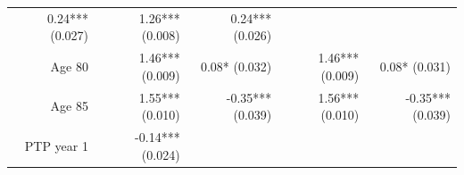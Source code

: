 \documentclass[]{article}
\begin{document}
\begin{longtable}[c]{@{}rrrrr@{}}
\begin{minipage}[t]{0.16\columnwidth}
0.24*** (0.027)
\strut\end{minipage} &
\begin{minipage}[t]{0.21\columnwidth}\raggedleft\strut
1.26*** (0.008)
\strut\end{minipage} &
\begin{minipage}[t]{0.15\columnwidth}\raggedleft\strut
0.24*** (0.026)
\strut\end{minipage}\tabularnewline
\begin{minipage}[t]{0.17\columnwidth}\raggedleft\strut
Age 80
\strut\end{minipage} &
\begin{minipage}[t]{0.18\columnwidth}\raggedleft\strut
1.46*** (0.009)
\strut\end{minipage} &
\begin{minipage}[t]{0.16\columnwidth}\raggedleft\strut
0.08* (0.032)
\strut\end{minipage} &
\begin{minipage}[t]{0.21\columnwidth}\raggedleft\strut
1.46*** (0.009)
\strut\end{minipage} &
\begin{minipage}[t]{0.15\columnwidth}\raggedleft\strut
0.08* (0.031)
\strut\end{minipage}\tabularnewline
\begin{minipage}[t]{0.17\columnwidth}\raggedleft\strut
Age 85
\strut\end{minipage} &
\begin{minipage}[t]{0.18\columnwidth}\raggedleft\strut
1.55*** (0.010)
\strut\end{minipage} &
\begin{minipage}[t]{0.16\columnwidth}\raggedleft\strut
-0.35*** (0.039)
\strut\end{minipage} &
\begin{minipage}[t]{0.21\columnwidth}\raggedleft\strut
1.56*** (0.010)
\strut\end{minipage} &
\begin{minipage}[t]{0.15\columnwidth}\raggedleft\strut
-0.35*** (0.039)
\strut\end{minipage}\tabularnewline
\begin{minipage}[t]{0.17\columnwidth}\raggedleft\strut
PTP year 1
\strut\end{minipage} &
\begin{minipage}[t]{0.18\columnwidth}\raggedleft\strut
-0.14*** (0.024)
\strut\end{minipage} &
\begin{minipage}[t]{0.16\columnwidth}\raggedleft\strut

\end{minipage}
\end{longtable}
\end{document}
